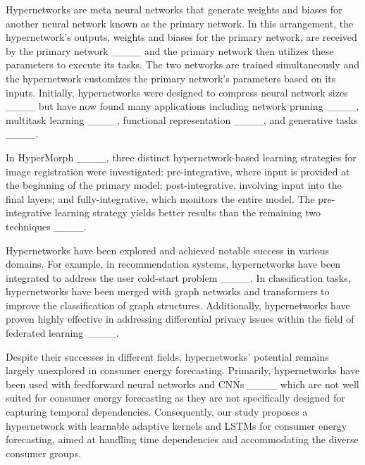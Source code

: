 Hypernetworks are meta neural networks that generate weights and biases for another neural network known as the primary network. In this arrangement, the hypernetwork's outputs, weights and biases for the primary network, are received by the primary network ____ and the primary network then utilizes these parameters to execute its tasks. The two networks are trained simultaneously and the hypernetwork customizes the primary network's parameters based on its inputs. Initially, hypernetworks were designed to compress neural network sizes ____ but have now found many applications including network pruning ____, multitask learning ____, functional representation ____, and generative tasks ____.

In HyperMorph ____, three distinct hypernetwork-based learning strategies for image registration were investigated: pre-integrative, where input is provided at the beginning of the primary model; post-integrative, involving input into the final layers; and fully-integrative, which monitors the entire model. The pre-integrative learning strategy yields better results than the remaining two techniques ____.

Hypernetworks have been explored and achieved notable success in various domains. For example, in recommendation systems, hypernetworks have been integrated to address the user cold-start problem ____. In classification tasks, hypernetworks have been merged with graph networks and transformers to improve the classification of graph structures. Additionally, hypernetworks have proven highly effective in addressing differential privacy issues within the field of federated learning ____.

Despite their successes in different fields, hypernetworks' potential remains largely unexplored in {consumer energy} forecasting. Primarily, hypernetworks have been used with feedforward neural networks and CNNs ____ which are not well suited for {consumer energy} forecasting as they are not specifically designed for capturing temporal dependencies. Consequently, our study proposes a hypernetwork with learnable adaptive kernels and LSTMs for {consumer energy} forecasting, aimed at handling time dependencies and accommodating the diverse consumer groups.


\vspace{-5pt}